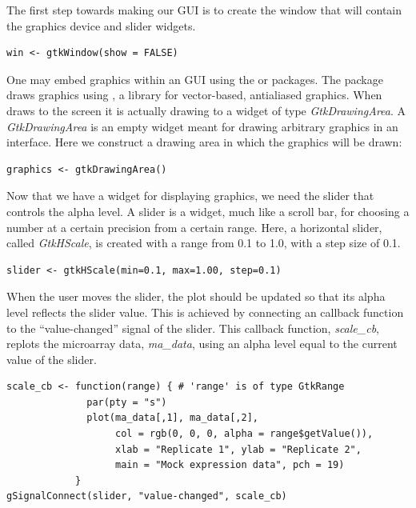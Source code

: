 \documentclass[article]{jss}
\begin{document}
The first step towards making our GUI is to create the window that
will contain the graphics device and slider widgets.
\begin{verbatim}
win <- gtkWindow(show = FALSE)
\end{verbatim}

One may embed  graphics within an  GUI using
the  \citep{cairoDevice} or 
\citep{gtkDevice} packages. The  package draws
 graphics using  \citep{cairo}, a library for
vector-based, antialiased graphics.  When  draws to
the screen it is actually drawing to a  widget of type
\emph{GtkDrawingArea}. A \emph{GtkDrawingArea} is an empty widget
meant for drawing arbitrary graphics in an interface. Here we
construct a drawing area in which the  graphics will be
drawn:
\begin{verbatim}
graphics <- gtkDrawingArea()
\end{verbatim}

Now that we have a widget for displaying  graphics, we
need the slider that controls the alpha level. A slider is a widget,
much like a scroll bar, for choosing a number at a certain precision
from a certain range. Here, a horizontal slider, called
\emph{GtkHScale}, is created with a range from 0.1 to 1.0, with a
step size of 0.1.
\begin{verbatim}
slider <- gtkHScale(min=0.1, max=1.00, step=0.1)
\end{verbatim}

When the user moves the slider, the plot should be updated so that its
alpha level reflects the slider value. This is achieved by connecting
an  callback function to the ``value-changed'' signal of
the slider.  This callback function, \emph{scale\_cb}, replots the
microarray data, \emph{ma\_data}, using an alpha level equal to the
current value of the slider.
\begin{verbatim}
scale_cb <- function(range) { # 'range' is of type GtkRange
              par(pty = "s")
              plot(ma_data[,1], ma_data[,2], 
                   col = rgb(0, 0, 0, alpha = range$getValue()),
                   xlab = "Replicate 1", ylab = "Replicate 2", 
                   main = "Mock expression data", pch = 19)
            }
gSignalConnect(slider, "value-changed", scale_cb)
\end{verbatim}
\end{document}
